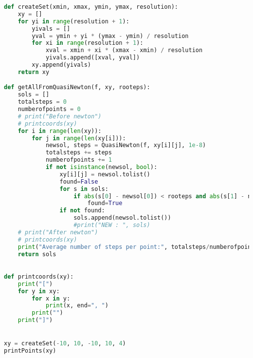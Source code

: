 \begin{lstlisting}[language=Python, style=jupycolors]
def createSet(xmin, xmax, ymin, ymax, resolution):
    xy = []
    for yi in range(resolution + 1):
        yivals = []
        yval = ymin + yi * (ymax - ymin) / resolution
        for xi in range(resolution + 1):
            xval = xmin + xi * (xmax - xmin) / resolution
            yivals.append([xval, yval])
        xy.append(yivals)
    return xy

def getAllFromQuasiNewton(f, xy, rooteps):
    sols = []
    totalsteps = 0
    numberofpoints = 0
    # print("Before newton")
    # printcoords(xy)
    for i in range(len(xy)):
        for j in range(len(xy[i])):
            newsol, steps = QuasiNewton(f, xy[i][j], 1e-8)
            totalsteps += steps
            numberofpoints += 1
            if not isinstance(newsol, bool):
                xy[i][j] = newsol.tolist()
                found=False
                for s in sols:
                    if abs(s[0] - newsol[0]) < rooteps and abs(s[1] - newsol[1]) < rooteps:
                        found=True
                if not found:
                    sols.append(newsol.tolist())
                    #print("NEW : ", sols)
    # print("After newton")
    # printcoords(xy)
    print("Average number of steps per point:", totalsteps/numberofpoints)
    return sols
            

def printcoords(xy):
    print("[")
    for y in xy:
        for x in y:
            print(x, end=", ")
        print("")
    print("]")


xy = createSet(-10, 10, -10, 10, 4)
printPoints(xy)
\end{lstlisting}